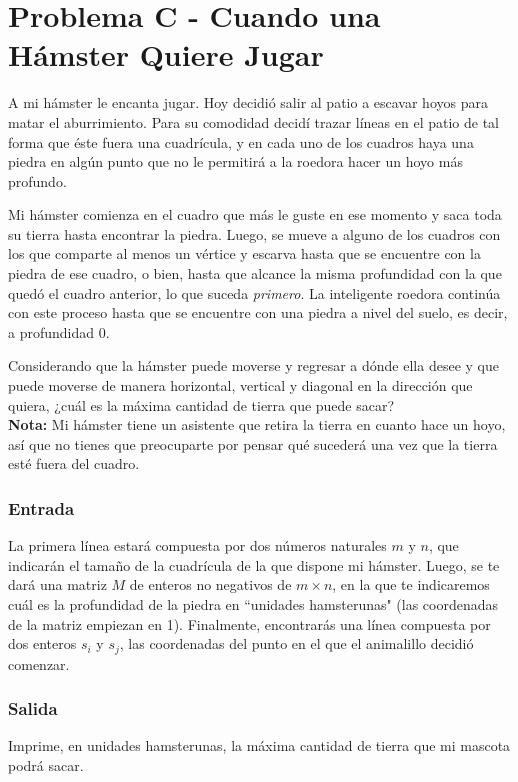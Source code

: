 \chapter*{Problema C - Cuando una Hámster Quiere Jugar}

A mi hámster le encanta jugar. Hoy decidió salir al
patio a escavar hoyos para matar el aburrimiento. Para 
su comodidad decidí trazar líneas en el patio de tal 
forma que éste fuera una cuadrícula, y en cada uno de 
los cuadros haya una piedra en algún punto que no le 
permitirá a la roedora hacer un hoyo más profundo.

Mi hámster comienza en el cuadro que más le guste en
ese momento y saca toda su tierra hasta encontrar la
piedra. Luego, se mueve a alguno de los cuadros con los
que comparte al menos un vértice y escarva hasta que se
encuentre con la piedra de ese cuadro, o bien, hasta que
alcance la misma profundidad con la que quedó el cuadro 
anterior, lo que suceda \textit{primero}. La inteligente
roedora continúa con este proceso hasta que se encuentre
con una piedra a nivel del suelo, es decir, a profundidad
0.

Considerando que la hámster puede moverse y regresar a
dónde ella desee y que puede moverse de manera 
horizontal, vertical y diagonal en la dirección que 
quiera, ¿cuál es la máxima cantidad de tierra que puede
sacar?
$$ $$
\textbf{Nota:} Mi hámster tiene un asistente que retira
la tierra en cuanto hace un hoyo, así que no tienes que 
preocuparte por pensar qué sucederá una vez que la 
tierra esté fuera del cuadro.




\subsection*{Entrada}
La primera línea estará compuesta por dos números 
naturales $m$ y $n$, que indicarán el tamaño de la 
cuadrícula de la que dispone mi hámster. Luego, se te
dará una matriz $M$ de enteros no negativos de $m \times 
n$, en la que te indicaremos cuál es la profundidad de la
piedra en ``unidades hamsterunas" (las coordenadas de la
matriz empiezan en 1). Finalmente, encontrarás una línea
compuesta por dos enteros $s_i$ y $s_j$, las coordenadas 
del punto en el que el animalillo decidió comenzar.



\subsection*{Salida}
Imprime, en unidades hamsterunas, la máxima cantidad de
tierra que mi mascota podrá sacar.



